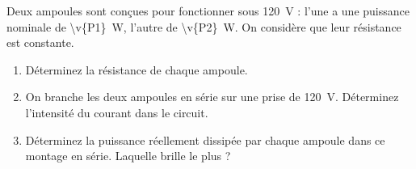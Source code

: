 Deux ampoules sont conçues pour fonctionner sous \qty{120}{V} : l'une a une puissance nominale de \qty{\v{P1}}{W}, l'autre de \qty{\v{P2}}{W}. On considère que leur résistance est constante.

\begin{enumerate}[label=\alph*)]
    \item Déterminez la résistance de chaque ampoule.
    \item On branche les deux ampoules en série sur une prise de \qty{120}{V}. Déterminez l'intensité du courant dans le circuit.
    \item Déterminez la puissance réellement dissipée par chaque ampoule dans ce montage en série. Laquelle brille le plus ?
\end{enumerate}
